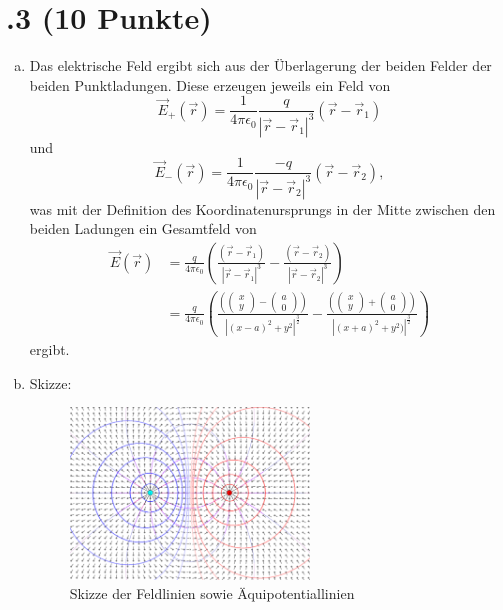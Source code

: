 \section*{\nr.3 \titthree (10 Punkte)}
\begin{enumerate}[(a)]
<<<<<<< HEAD
\item Das elektrische Feld ergibt sich aus der Überlagerung der beiden Felder der beiden Punktladungen. Diese erzeugen jeweils ein Feld von
\begin{equation}
  \vec E_+(\vec r)= \frac{1}{4 \pi \epsilon_0}\frac{q}{|\vec r - \vec r_1|^3}(\vec r - \vec r_1)
\end{equation}
und
\begin{equation}
  \vec E_-(\vec r)= \frac{1}{4 \pi \epsilon_0}\frac{-q}{|\vec r - \vec r_2|^3}(\vec r - \vec r_2),
\end{equation}
was mit der Definition des Koordinatenursprungs in der Mitte zwischen den beiden Ladungen ein Gesamtfeld von
\begin{align}
  \vec E(\vec r) &= \frac{q}{4 \pi \epsilon_0}\left(\frac{(\vec r - \vec r_1)}{|\vec r - \vec r_1|^3}-\frac{(\vec r - \vec r_2)}{|\vec r - \vec r_2|^3}\right) \\  
  &= \frac{q}{4 \pi \epsilon_0}\left(\frac{\left(\begin{pmatrix} x\\y \end{pmatrix} - \begin{pmatrix} a\\0 \end{pmatrix}\right)}{|(x-a)^2+y^2|^{\frac{3}{2}}}-\frac{\left(\begin{pmatrix} x\\y \end{pmatrix} + \begin{pmatrix} a\\0 \end{pmatrix}\right)}{|(x+a)^2+y^2)|^{\frac{3}{2}}}\right)
\end{align}
ergibt.

\item Skizze:

    \begin{figure}[H]
    \begin{center}
    \includegraphics[width=0.6\textwidth]{Aufgaben/Skizze.png}
    \caption{Skizze der Feldlinien sowie Äquipotentiallinien}
    \label{f:times}
    \end{center}
    \end{figure}


\end{enumerate}
